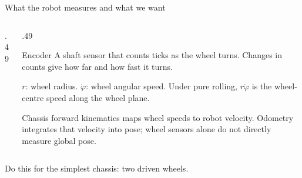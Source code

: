 \documentclass[aspectratio=169]{beamer}
\begin{document}
\begin{frame}[t]{What the robot measures and what we want}
\footnotesize
\vspace{-6mm}
\begin{columns}[T,onlytextwidth]\begin{column}{.49\textwidth}
\centering{}
\end{column}\begin{column}{.49\textwidth}
\begin{block}{Encoder}
A shaft sensor that counts ticks as the wheel turns. Changes in counts give how far and how fast it turns.
\end{block}
\vspace{3mm}
\footnotesize $r$: wheel radius. $\dot\varphi$: wheel angular speed. Under pure rolling, $r\dot\varphi$ is the wheel-centre speed along the wheel plane.\par\medskip Chassis forward kinematics maps wheel speeds to robot velocity. Odometry integrates that velocity into pose; wheel sensors alone do not directly measure global pose.
\end{column}\end{columns}
\par\vspace{2mm}\footnotesize Do this for the simplest chassis: two driven wheels.
\end{frame}
\end{document}
